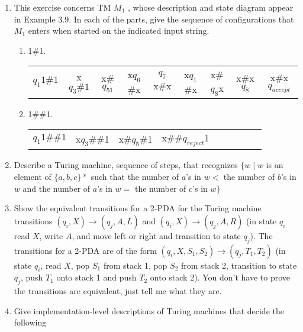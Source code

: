\documentclass{article}
\begin{document}
\begin{enumerate}
\begin{enumerate}[label = (\alph*) ]
        \end{enumerate}
        \item  This exercise concerns TM $M_1$ , whose description and state diagram appear in 
        Example 3.9. In each of the parts, give the sequence of configurations that $M_1$ 
        enters when started on the indicated input string.
        \begin{enumerate}[label = (\alph*) ]
            \item 1\#1.\newline
            \begin{tabular}{c c c c c c c c c}
                $q_1 1\#1$\textvisiblespace & x$q_3\#1$\textvisiblespace & x\#$q_51$\textvisiblespace
                & x$q_6$\#x\textvisiblespace & $q_7$x\#x\textvisiblespace & x$q_1$\#x\textvisiblespace 
                & x\#$q_8$x\textvisiblespace & x\#x$q_8$\textvisiblespace & x\#x\textvisiblespace$q_{accept}$
            \end{tabular}
            \item 1\#\#1.\newline
            \begin{tabular}{c c c c c c c c c}
                $q_1 1\#\#1$\textvisiblespace & x$q_3$\#\#1\textvisiblespace 
                & x\#$q_5$\#1\textvisiblespace & x\#\#$q_{reject}$1\textvisiblespace
            \end{tabular}
        \end{enumerate}
        \item Describe a Turing machine, sequence of steps, that recognizes 
        $\{ w \mid w $ is an element of $ \{a, b, 
        c\}* $ such that the number of $a$'s in $w <$ the number of $b$'s in $w$ and the number 
        of $a$'s in $w =$ the number of $c$'s in $w \}$
        \item Show the equivalent transitions for a 2-PDA for the 
        Turing machine transitions $(q_i, X) \rightarrow (q_j, A, L)$ and $(q_i, X) \rightarrow 
        (q_j, A, R)$ (in state $q_i$ read $X$, write $A$, and move left or right and transition to 
        state $q_j$). The transitions for a 2-PDA are of the form $(q_i, X, S_1, S_2) \rightarrow
        (q_j, T_1, T_2)$ (in state $q_i$, read $X$, pop $S_1$ from stack 1, pop $S_2$ from stack 2, 
        transition to state $q_j$, push $T_1$ onto stack 1 and push $T_2$ onto stack 2). You don't 
        have to prove the transitions are equivalent, just tell me what they are.
        \item Give implementation-level descriptions of Turing machines that decide the following 

\end{enumerate}
\end{document}
